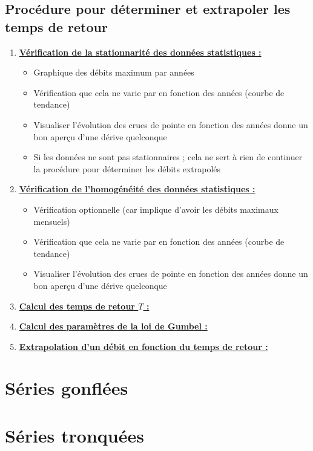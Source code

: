 \subsection{Procédure pour déterminer et extrapoler les temps de retour}
\begin{enumerate}
    \item \textbf{\underline{Vérification de la stationnarité des données statistiques :}} \\
    \begin{itemize}
        \item Graphique des débits maximum par années
        \item Vérification que cela ne varie par en fonction des années (courbe de tendance)
        \item Visualiser l'évolution des crues de pointe en fonction des années donne un bon aperçu d'une dérive quelconque
        \item \Warning Si les données ne sont pas stationnaires ; cela ne sert à rien de continuer la procédure pour déterminer les débits extrapolés
    \end{itemize}
    \bigskip
    \item \textbf{\underline{Vérification de l'homogénéité des données statistiques :}}
    \begin{itemize}
        \item Vérification optionnelle (car implique d'avoir les débits maximaux mensuels)
        \item Vérification que cela ne varie par en fonction des années (courbe de tendance)
        \item Visualiser l'évolution des crues de pointe en fonction des années donne un bon aperçu d'une dérive quelconque
    \end{itemize}
    \bigskip
    \item \textbf{\underline{Calcul des temps de retour $T$ :}}
    \item \textbf{\underline{Calcul des paramètres de la loi de Gumbel :}}
    \item \textbf{\underline{Extrapolation d'un débit en fonction du temps de retour :}}
\end{enumerate}


\section{Séries gonflées}
\section{Séries tronquées}